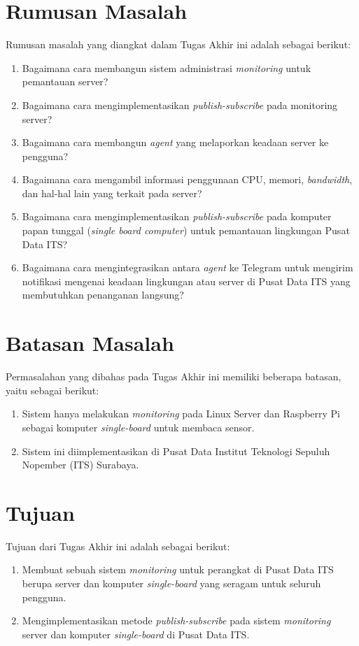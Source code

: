 \section{Rumusan Masalah}
Rumusan masalah yang diangkat dalam Tugas Akhir ini adalah sebagai berikut:
\begin{enumerate}
	\item Bagaimana cara membangun sistem administrasi \textit{monitoring} untuk pemantauan server?
	\item Bagaimana cara mengimplementasikan \textit{publish-subscribe} pada monitoring server?
	\item Bagaimana cara membangun \textit{agent} yang melaporkan keadaan server ke pengguna?
	\item Bagaimana cara mengambil informasi penggunaan CPU, memori, \textit{bandwidth}, dan hal-hal lain yang terkait pada server?
	\item Bagaimana cara mengimplementasikan \textit{publish-subscribe} pada komputer papan tunggal (\textit{single board computer}) untuk pemantauan lingkungan Pusat Data ITS?
	\item Bagaimana cara mengintegrasikan antara \textit{agent} ke Telegram untuk mengirim notifikasi mengenai keadaan lingkungan atau server di Pusat Data ITS yang membutuhkan penanganan langsung?
\end{enumerate}

\section{Batasan Masalah}
Permasalahan yang dibahas pada Tugas Akhir ini memiliki beberapa batasan, yaitu sebagai berikut:

\begin{enumerate}
	\item Sistem hanya melakukan \textit{monitoring} pada Linux Server dan Raspberry Pi sebagai komputer \textit{single-board} untuk membaca sensor.
	\item Sistem ini diimplementasikan di Pusat Data Institut Teknologi Sepuluh Nopember (ITS) Surabaya.
\end{enumerate}

\section{Tujuan}
Tujuan dari Tugas Akhir ini adalah sebagai berikut:

\begin{enumerate}
	\item Membuat sebuah sistem \textit{monitoring} untuk perangkat di Pusat Data ITS berupa server dan komputer \textit{single-board} yang seragam untuk seluruh pengguna.
	\item Mengimplementasikan metode \textit{publish-subscribe} pada sistem \textit{monitoring} server dan komputer \textit{single-board} di Pusat Data ITS.
\end{enumerate}

